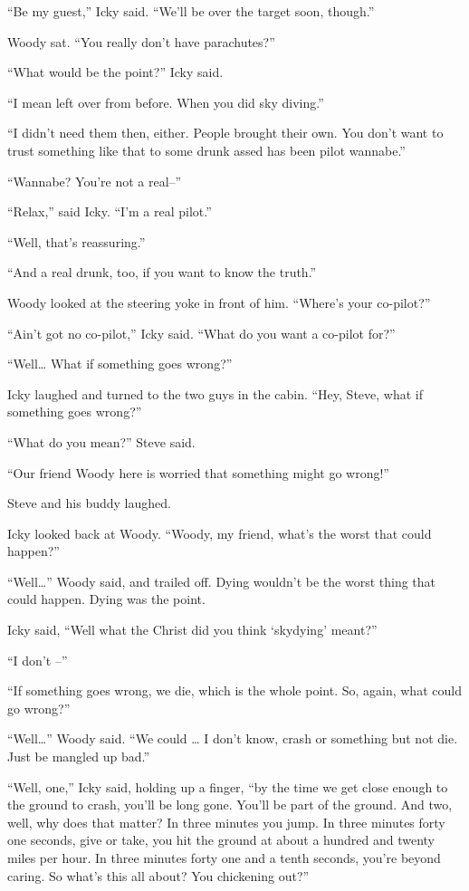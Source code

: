 “Be my guest,” Icky said. “We’ll be over the target soon, though.”

Woody sat. “You really don’t have parachutes?”

“What would be the point?” Icky said.

“I mean left over from before. When you did sky diving.”

“I didn’t need them then, either. People brought their own. You don’t want to trust something like that to some drunk assed has been pilot wannabe.”

“Wannabe? You’re not a real–”

“Relax,” said Icky. “I’m a real pilot.”

“Well, that’s reassuring.”

“And a real drunk, too, if you want to know the truth.”

Woody looked at the steering yoke in front of him. “Where’s your co-pilot?”

“Ain’t got no co-pilot,” Icky said. “What do you want a co-pilot for?”

“Well… What if something goes wrong?”

Icky laughed and turned to the two guys in the cabin. “Hey, Steve, what if something goes wrong?”

“What do you mean?” Steve said.

“Our friend Woody here is worried that something might go wrong!”

Steve and his buddy laughed.

Icky looked back at Woody. “Woody, my friend, what’s the worst that could happen?”

“Well…” Woody said, and trailed off. Dying wouldn’t be the worst thing that could happen. Dying was the point.

Icky said, “Well what the Christ did you think `skydying’ meant?”

“I don’t –”

“If something goes wrong, we die, which is the whole point. So, again, what could go wrong?”

“Well…” Woody said. “We could … I don’t know, crash or something but not die. Just be mangled up bad.”

“Well, one,” Icky said, holding up a finger, “by the time we get close enough to the ground to crash, you’ll be long gone. You’ll be part of the ground. And two, well, why does that matter? In three minutes you jump. In three minutes forty one seconds, give or take, you hit the ground at about a hundred and twenty miles per hour. In three minutes forty one and a tenth seconds, you’re beyond caring. So what’s this all about? You chickening out?”

